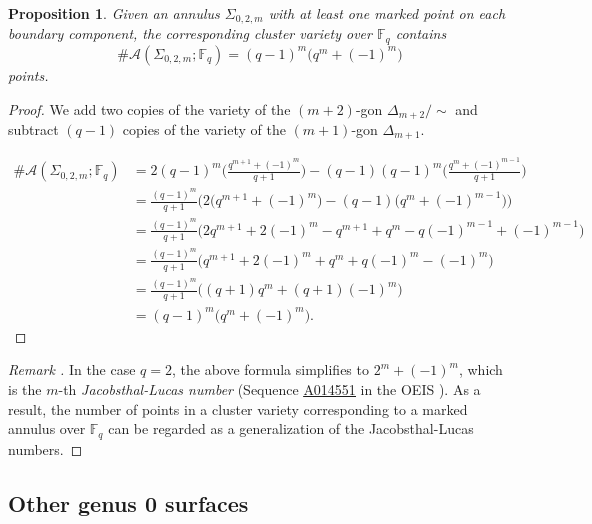 \documentclass[reqno,12pt]{amsart}
\newtheorem{prop}[thm]{Proposition}
\theoremstyle{definition}
\theoremstyle{remark}
\theoremstyle{remark}
\newenvironment{rem}{\refstepcounter{thm}\begin{proof}[Remark \emph{\thethm}]\renewcommand*{\qedsymbol}{\(\blacksquare\)}}{\end{proof}}
\numberwithin{equation}{section}
\newcommand{\seqnum}[1]{\href{https://oeis.org/#1}{\rm \underline{#1}}}
\begin{document}
\begin{prop}\label{prop:annulus points}
    Given an annulus $\Sigma_{0,2,m}$ with at least one marked point on each boundary component, the corresponding cluster variety over $\mathbb{F}_q$ contains \[ \#\mathcal{A}(\Sigma_{0,2,m}; \mathbb{F}_q) = (q-1)^{m} \big( q^{m} + (-1)^{m} \big) \] points.
\end{prop}
\begin{proof}
	We add two copies of the variety of the $(m+2)$-gon $\Delta_{m+2}/\!\sim$ and subtract $(q-1)$ copies of the variety of the $(m+1)$-gon $\Delta_{m+1}$.

    \begin{align*}
        \#\mathcal{A}(\Sigma_{0,2,m}; \mathbb{F}_q) &= 2 (q-1)^{m} \Bigg( \frac{q^{m+1} + (-1)^{m}}{q+1} \Bigg) - (q-1)(q-1)^{m} \Bigg( \frac{q^{m} + (-1)^{m-1}}{q+1} \Bigg) \\
        &= \frac{(q-1)^{m}}{q+1} \big( 2\big(q^{m+1} + (-1)^{m}\big) - (q-1)\big( q^{m} + (-1)^{m-1}\big) \big) \\
        &= \frac{(q-1)^{m}}{q+1} \big( 2q^{m+1} + 2(-1)^{m} - q^{m+1} + q^m - q(-1)^{m-1} +(-1)^{m-1} \big) \\
        &= \frac{(q-1)^{m}}{q+1} \big( q^{m+1} +2(-1)^{m} +q^m +q(-1)^m - (-1)^m  \big) \\
        &= \frac{(q-1)^{m}}{q+1} \big( (q+1)q^{m} + (q+1)(-1)^{m} \big) \\
        &= (q-1)^{m} \big( q^{m} + (-1)^{m} \big).
    \end{align*}
\end{proof}

\begin{rem}
    In the case $q=2$, the above formula simplifies to $2^m + (-1)^m$, which is the $m$-th \emph{Jacobsthal-Lucas number} (Sequence \seqnum{A014551} in the OEIS \cite{oeis}). As a result, the number of points in a cluster variety corresponding to a marked annulus over $\mathbb{F}_q$ can be regarded as a generalization of the Jacobsthal-Lucas numbers. 
\end{rem}

\subsection{Other genus 0 surfaces}
\end{document}
